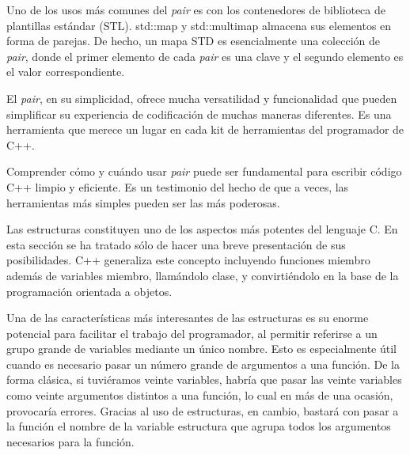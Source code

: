 Uno de los usos más comunes del \emph{pair} es con los contenedores de biblioteca de plantillas estándar (STL). std::map y std::multimap almacena sus elementos en forma de parejas. De hecho, un mapa STD es esencialmente una colección de \emph{pair}, donde el primer elemento de cada \emph{pair} es una clave y el segundo elemento es el valor correspondiente.

El \emph{pair}, en su simplicidad, ofrece mucha versatilidad y funcionalidad que pueden simplificar su experiencia de codificación de muchas maneras diferentes. Es una herramienta que merece un lugar en cada kit de herramientas del programador de C++.

Comprender cómo y cuándo usar \emph{pair} puede ser fundamental para escribir código C++ limpio y eficiente. Es un testimonio del hecho de que a veces, las herramientas más simples pueden ser las más poderosas.

Las estructuras constituyen uno de los aspectos más potentes del lenguaje C. En esta
sección se ha tratado sólo de hacer una breve presentación de sus posibilidades. C++
generaliza este concepto incluyendo funciones miembro además de variables miembro,
llamándolo clase, y convirtiéndolo en la base de la programación orientada a objetos.

Una de las características más interesantes de las estructuras es su enorme potencial para facilitar el trabajo del programador, al permitir referirse a un grupo grande de variables mediante un único nombre. Esto es especialmente útil cuando es necesario pasar un número grande de argumentos a una función. De la forma clásica, si tuviéramos
veinte variables, habría que pasar las veinte variables como veinte argumentos distintos a una función, lo cual en más de una ocasión, provocaría errores. Gracias al uso de
estructuras, en cambio, bastará con pasar a la función el nombre de la variable estructura que agrupa todos los argumentos necesarios para la función.